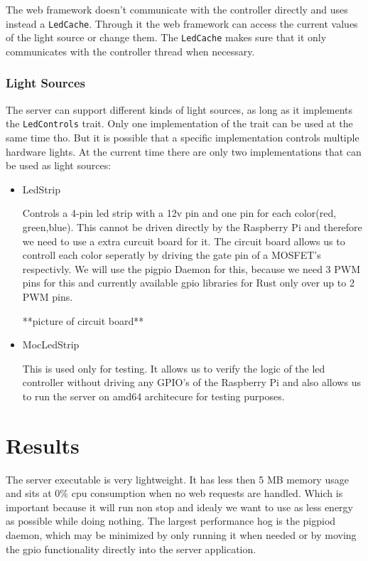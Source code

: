 \documentclass[conference]{IEEEtran}
\begin{document}
The web framework doesn't communicate with the controller directly and uses instead a \texttt{LedCache}. Through it the web framework can access the current values of the light source or change them. The \texttt{LedCache} makes sure that it only communicates with the controller thread when necessary.


\subsubsection{Light Sources}

The server can support different kinds of light sources, as long as it implements the \texttt{LedControls} trait. Only one implementation 
of the trait can be used at the same time tho. But it is possible that a specific implementation controls multiple hardware lights.
At the current time there are only two implementations that can be used as light sources:

\begin{itemize}
    \item LedStrip
    
    Controls a 4-pin led strip with a 12v pin and one pin for each color(red, green,blue). This cannot be driven directly by the
    Raspberry Pi and therefore we need to use a extra curcuit board\cite{rpiled} for it. The circuit board allows us to controll each
    color seperatly by driving the gate pin of a MOSFET's respectivly. We will use the pigpio Daemon\cite{pigpiod} for this, because we 
    need 3 PWM pins for this and currently available gpio libraries for Rust only over up to 2 PWM pins.
    
    **picture of circuit board**

    \item MocLedStrip
    
    This is used only for testing. It allows us to verify the logic of the led controller without driving any GPIO's of the Raspberry Pi 
    and also allows us to run the server on amd64 architecure for testing purposes.
\end{itemize}



\section{Results}

The server executable is very lightweight. It has less then 5 MB memory usage and sits at 0\% cpu consumption when no web requests are handled. Which is important because it will run non stop and idealy we want to use as less energy as possible while doing nothing. The largest performance hog is the pigpiod daemon, which may be minimized by only running it when needed or by moving the gpio functionality directly into the server application.
\end{document}
